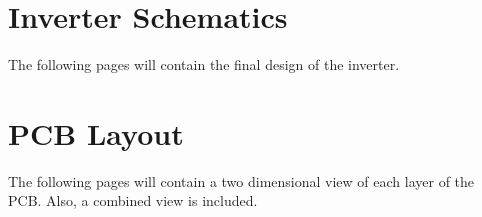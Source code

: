 \documentclass[11pt,titlepage]{report}
\begin{document}
\begin{appendices}
\renewcommand{\chapternumber}{\appendixname\space\thechapter} 
\chapter{Inverter Schematics}
\label{app:schematics}
The following pages will contain the final design of the inverter.

\chapter{PCB Layout}
\label{app:pcb_layout}
The following pages will contain a two dimensional view of each layer of the PCB. Also, a combined view is included.


\end{appendices}
\end{document}
